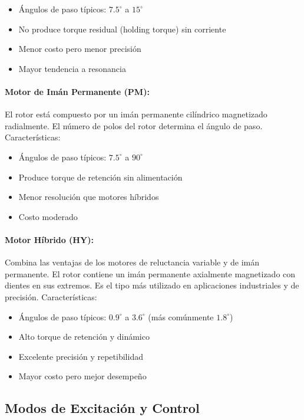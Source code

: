 \begin{itemize}
    \item Ángulos de paso típicos: $7.5^\circ$ a $15^\circ$
    \item No produce torque residual (holding torque) sin corriente
    \item Menor costo pero menor precisión
    \item Mayor tendencia a resonancia
\end{itemize}

\paragraph{Motor de Imán Permanente (PM):}

El rotor está compuesto por un imán permanente cilíndrico magnetizado radialmente. El número de polos del rotor determina el ángulo de paso. Características:

\begin{itemize}
    \item Ángulos de paso típicos: $7.5^\circ$ a $90^\circ$
    \item Produce torque de retención sin alimentación
    \item Menor resolución que motores híbridos
    \item Costo moderado
\end{itemize}

\paragraph{Motor Híbrido (HY):}

Combina las ventajas de los motores de reluctancia variable y de imán permanente. El rotor contiene un imán permanente axialmente magnetizado con dientes en sus extremos. Es el tipo más utilizado en aplicaciones industriales y de precisión. Características:

\begin{itemize}
    \item Ángulos de paso típicos: $0.9^\circ$ a $3.6^\circ$ (más comúnmente $1.8^\circ$)
    \item Alto torque de retención y dinámico
    \item Excelente precisión y repetibilidad
    \item Mayor costo pero mejor desempeño
\end{itemize}

\subsection{Modos de Excitación y Control}

